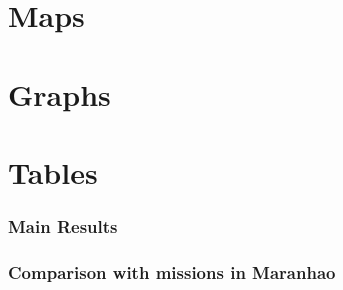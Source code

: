 \documentclass{article}
\begin{document}
\newpage


\printbibliography

% 

\FloatBarrier
\clearpage

\section*{Maps}



\FloatBarrier
\clearpage

\section*{Graphs}



\FloatBarrier
\clearpage

\section*{Tables}





\subsubsection*{Main Results}





\FloatBarrier
\clearpage

\subsubsection*{Comparison with missions in Maranhao}


\end{document}
